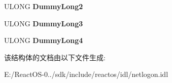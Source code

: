 \begin{DoxyCompactItemize}
U\+L\+O\+NG {\bfseries Dummy\+Long2}
\item 
\mbox{\label{struct___n_e_t_l_o_g_o_n___d_e_l_t_a___t_r_u_s_t_e_d___d_o_m_a_i_n_s_a485ed08cf3d47f53e65f8edd71e4f2bf}} 
U\+L\+O\+NG {\bfseries Dummy\+Long3}
\item 
\mbox{\label{struct___n_e_t_l_o_g_o_n___d_e_l_t_a___t_r_u_s_t_e_d___d_o_m_a_i_n_s_a51d24e69d9705b32f9058aafe90aa95f}} 
U\+L\+O\+NG {\bfseries Dummy\+Long4}
\end{DoxyCompactItemize}


该结构体的文档由以下文件生成\+:\begin{DoxyCompactItemize}
\item 
E\+:/\+React\+O\+S-\/0../sdk/include/reactos/idl/netlogon.\+idl\end{DoxyCompactItemize}

